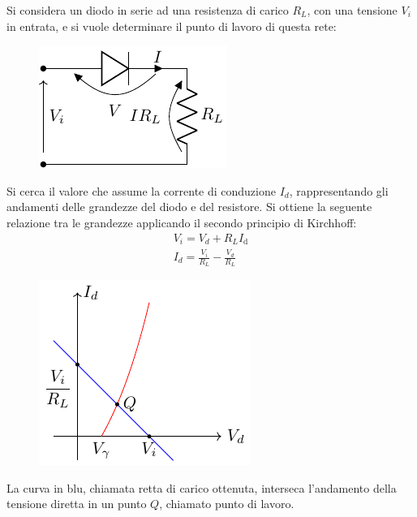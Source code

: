 \documentclass{article}
\newcommand{\df}{\mathrm{d}}
\numberwithin{equation}{subsection}
\begin{document}
Si considera un diodo in serie ad una resistenza di carico $R_L$, con una tensione $V_i$ in entrata, e si vuole determinare il punto di lavoro di questa 
rete:
\begin{figure}[H]%
    \centering
    \includegraphics{diodo-resistenza-serie.pdf}%
    \label{fig:diodo-resistenza-serie}
\end{figure}
Si cerca il valore che assume la corrente di conduzione $I_d$, rappresentando gli andamenti delle grandezze del diodo e del resistore. 
Si ottiene la seguente relazione tra le grandezze applicando il secondo principio di Kirchhoff:
\begin{gather*}
    V_i=V_d+R_LI_\df\\
    I_d=\displaystyle\frac{V_i}{R_L}-\frac{V_d}{R_L}
\end{gather*}
\begin{figure}[H]%
    \centering
    \includegraphics{andamento-diodo-resistore-serie.pdf}%
    \label{fig:andamento-diodo-resistore-serie}
\end{figure}

La curva in blu, chiamata retta di carico ottenuta, interseca l'andamento della tensione diretta in un punto $Q$, chiamato punto di lavoro. 
\end{document}
